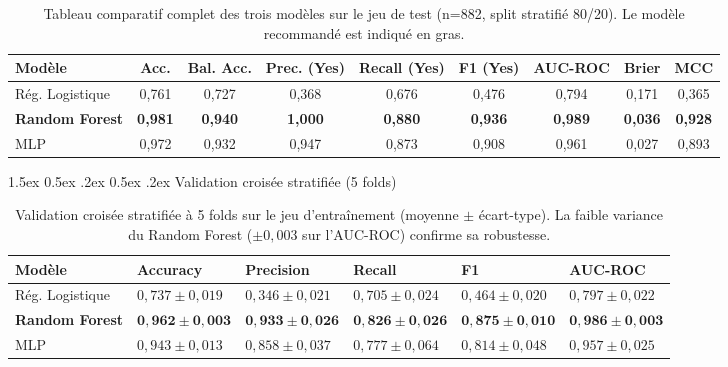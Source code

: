 \documentclass[12pt,a4paper]{article}
\makeatletter
\renewcommand\paragraph{\@startsection{paragraph}{4}{\z@}%
  {1.5ex \@plus 0.5ex \@minus .2ex}%
  {0.5ex \@plus .2ex}%
  {\normalfont\normalsize\bfseries}}
\makeatother
\begin{document}
\begin{table}[ht]
\centering
\small
\begin{tabularx}{\textwidth}{lcccccccc}
\toprule
\textbf{Modèle} & \textbf{Acc.} & \textbf{Bal. Acc.} & \textbf{Prec. (Yes)} & \textbf{Recall (Yes)} & \textbf{F1 (Yes)} & \textbf{AUC-ROC} & \textbf{Brier} & \textbf{MCC} \\
\midrule
Rég. Logistique & 0{,}761 & 0{,}727 & 0{,}368 & 0{,}676 & 0{,}476 & 0{,}794 & 0{,}171 & 0{,}365 \\
\textbf{Random Forest} & \textbf{0{,}981} & \textbf{0{,}940} & \textbf{1{,}000} & \textbf{0{,}880} & \textbf{0{,}936} & \textbf{0{,}989} & \textbf{0{,}036} & \textbf{0{,}928} \\
MLP & 0{,}972 & 0{,}932 & 0{,}947 & 0{,}873 & 0{,}908 & 0{,}961 & 0{,}027 & 0{,}893 \\
\bottomrule
\end{tabularx}
\caption{Tableau comparatif complet des trois modèles sur le jeu de test (n=882, split stratifié 80/20). Le modèle recommandé est indiqué en gras.}
\end{table}

\paragraph{Validation croisée stratifiée (5 folds)}

\begin{table}[ht]
\centering
\small
\begin{tabularx}{\textwidth}{lXXXXX}
\toprule
\textbf{Modèle} & \textbf{Accuracy} & \textbf{Precision} & \textbf{Recall} & \textbf{F1} & \textbf{AUC-ROC} \\
\midrule
Rég. Logistique & $0{,}737 \pm 0{,}019$ & $0{,}346 \pm 0{,}021$ & $0{,}705 \pm 0{,}024$ & $0{,}464 \pm 0{,}020$ & $0{,}797 \pm 0{,}022$ \\
\textbf{Random Forest} & $\mathbf{0{,}962 \pm 0{,}003}$ & $\mathbf{0{,}933 \pm 0{,}026}$ & $\mathbf{0{,}826 \pm 0{,}026}$ & $\mathbf{0{,}875 \pm 0{,}010}$ & $\mathbf{0{,}986 \pm 0{,}003}$ \\
MLP & $0{,}943 \pm 0{,}013$ & $0{,}858 \pm 0{,}037$ & $0{,}777 \pm 0{,}064$ & $0{,}814 \pm 0{,}048$ & $0{,}957 \pm 0{,}025$ \\
\bottomrule
\end{tabularx}
\caption{Validation croisée stratifiée à 5 folds sur le jeu d'entraînement (moyenne $\pm$ écart-type). La faible variance du Random Forest ($\pm 0{,}003$ sur l'AUC-ROC) confirme sa robustesse.}
\end{table}
\end{document}
